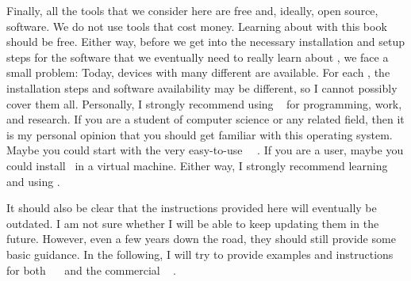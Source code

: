 Finally, all the tools that we consider here are free and, ideally, open source, software.
We do not use tools that cost money.
Learning about  with this book should be free.%
%
%
%
Either way, before we get into the necessary installation and setup steps for the software that we eventually need to really learn about , we face a small problem:
Today, devices with many different  are available.
For each , the installation steps and software availability may be different, so I cannot possibly cover them all.
Personally, I strongly recommend using \linux~\cite{T1999TLE,B2022ELATCL,H2022LML} for programming, work, and research.
If you are a student of computer science or any related field, then it is my personal opinion that you should get familiar with this operating system.
%
%
%
Maybe you could start with the very easy-to-use \ubuntu\ \linux~\cite{CN2020ULB,H2020ULU2E}.
If you are a \microsoftWindows\cite{B2023W1IO} user, maybe you could install \ubuntu\ in a virtual machine.
Either way, I strongly recommend learning and using \linux.

It should also be clear that the instructions provided here will eventually be outdated.
I am not sure whether I will be able to keep updating them in the future.
However, even a few years down the road, they should still provide some basic guidance.
In the following, I will try to provide examples and instructions for both \ubuntu\ \linux~\cite{CN2020ULB,H2020ULU2E} and the commercial \microsoftWindows~\cite{B2023W1IO} .%
%
%
%
%
%
%
%
\endhsection%
%
